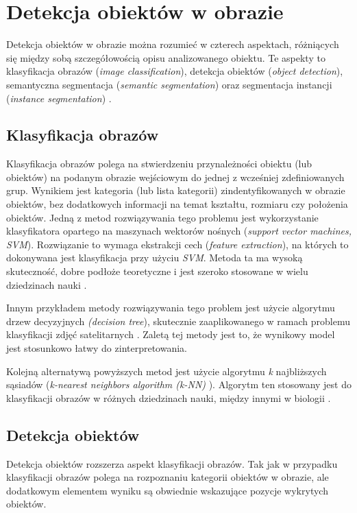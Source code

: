 \section{Detekcja obiektów w obrazie}
\label{sec:typy_detekcji}

Detekcja obiektów w obrazie można rozumieć w czterech aspektach, różniących się między sobą szczegółowością opisu analizowanego obiektu. Te aspekty to klasyfikacja obrazów (\textit{image classification}), detekcja obiektów (\textit{object detection}), semantyczna segmentacja (\textit{semantic segmentation}) oraz segmentacja instancji (\textit{instance segmentation}) \cite{survey-of-object-classification}.

\subsection*{Klasyfikacja obrazów}
Klasyfikacja obrazów polega na stwierdzeniu przynależności obiektu (lub obiektów) na podanym obrazie wejściowym do jednej z wcześniej zdefiniowanych grup. Wynikiem jest kategoria (lub lista kategorii) zindentyfikowanych w obrazie obiektów, bez dodatkowych informacji na temat kształtu, rozmiaru czy położenia obiektów. Jedną z metod rozwiązywania tego problemu jest wykorzystanie klasyfikatora opartego na maszynach wektorów nośnych (\textit{support vector machines, SVM}). Rozwiązanie to wymaga ekstrakcji cech (\textit{feature extraction}), na których to dokonywana jest klasyfikacja przy użyciu \textit{SVM}. Metoda ta ma wysoką skuteczność, dobre podłoże teoretyczne i jest szeroko stosowane w wielu dziedzinach nauki \cite{analysis-image-classification}.

Innym przykładem metody rozwiązywania tego problem jest użycie algorytmu drzew decyzyjnych \textit{(decision tree}), skutecznie zaaplikowanego w ramach problemu klasyfikacji zdjęć satelitarnych \cite{decision-image-classifier}. Zaletą tej metody jest to, że wynikowy model jest stosunkowo łatwy do zinterpretowania.

Kolejną alternatywą powyższych metod jest użycie algorytmu \textit{k} najbliższych sąsiadów (\textit{k-nearest neighbors algorithm (k-NN) }). Algorytm ten stosowany jest do klasyfikacji obrazów w różnych dziedzinach nauki, między innymi w biologii \cite{analysis-image-classification}.
\subsection*{Detekcja obiektów}
Detekcja obiektów rozszerza aspekt klasyfikacji obrazów. Tak jak w przypadku klasyfikacji obrazów polega na rozpoznaniu kategorii obiektów w obrazie, ale dodatkowym elementem wyniku są obwiednie wskazujące pozycje wykrytych obiektów.
